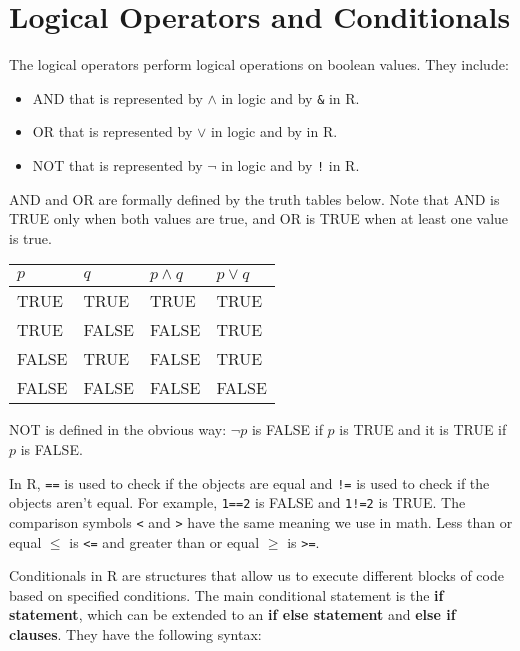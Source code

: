 \documentclass[
]{book}
\providecommand{\tightlist}{%
  \setlength{\itemsep}{0pt}\setlength{\parskip}{0pt}}
\theoremstyle{definition}
\theoremstyle{definition}
\theoremstyle{definition}
\theoremstyle{definition}
\theoremstyle{remark}
\begin{document}
\hypertarget{logical-operators-and-conditionals}{%
\section{Logical Operators and Conditionals}\label{logical-operators-and-conditionals}}

The logical operators perform logical operations on boolean values. They include:

\begin{itemize}
\tightlist
\item
  AND that is represented by \(\wedge\) in logic and by \texttt{\&} in R.
\item
  OR that is represented by \(\vee\) in logic and by \texttt{\textbar{}} in R.
\item
  NOT that is represented by \(\neg\) in logic and by \texttt{!} in R.
\end{itemize}

AND and OR are formally defined by the truth tables below. Note that AND is TRUE only when both values are true, and OR is TRUE when at least one value is true.

\begin{longtable}[]{@{}llll@{}}
\toprule\noalign{}
\(p\) & \(q\) & \(p\wedge q\) & \(p\vee q\) \\
\midrule\noalign{}
\endhead
\bottomrule\noalign{}
\endlastfoot
TRUE & TRUE & TRUE & TRUE \\
TRUE & FALSE & FALSE & TRUE \\
FALSE & TRUE & FALSE & TRUE \\
FALSE & FALSE & FALSE & FALSE \\
\end{longtable}

NOT is defined in the obvious way: \(\neg p\) is FALSE if \(p\) is TRUE and it is TRUE if \(p\) is FALSE.

In R, \texttt{==} is used to check if the objects are equal and \texttt{!=} is used to check if the objects aren't equal. For example, \texttt{1==2} is FALSE and \texttt{1!=2} is TRUE. The comparison symbols \texttt{\textless{}} and \texttt{\textgreater{}} have the same meaning we use in math. Less than or equal \(\leq\) is \texttt{\textless{}=} and greater than or equal \(\geq\) is \texttt{\textgreater{}=}.

Conditionals in R are structures that allow us to execute different blocks of code based on specified conditions. The main conditional statement is the \textbf{if statement}, which can be extended to an \textbf{if else statement} and \textbf{else if clauses}. They have the following syntax:
\end{document}
